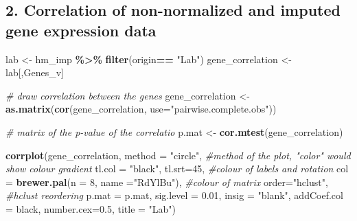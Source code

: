 \documentclass[
]{article}
\newenvironment{Shaded}{\begin{snugshade}}{\end{snugshade}}
\newcommand{\AttributeTok}[1]{\textcolor[rgb]{0.13,0.29,0.53}{#1}}
\newcommand{\CommentTok}[1]{\textcolor[rgb]{0.56,0.35,0.01}{\textit{#1}}}
\newcommand{\DecValTok}[1]{\textcolor[rgb]{0.00,0.00,0.81}{#1}}
\newcommand{\FloatTok}[1]{\textcolor[rgb]{0.00,0.00,0.81}{#1}}
\newcommand{\FunctionTok}[1]{\textcolor[rgb]{0.13,0.29,0.53}{\textbf{#1}}}
\newcommand{\NormalTok}[1]{#1}
\newcommand{\OtherTok}[1]{\textcolor[rgb]{0.56,0.35,0.01}{#1}}
\newcommand{\SpecialCharTok}[1]{\textcolor[rgb]{0.81,0.36,0.00}{\textbf{#1}}}
\newcommand{\StringTok}[1]{\textcolor[rgb]{0.31,0.60,0.02}{#1}}
\begin{document}
\hypertarget{correlation-of-non-normalized-and-imputed-gene-expression-data}{%
\subsection{2. Correlation of non-normalized and imputed gene expression
data}\label{correlation-of-non-normalized-and-imputed-gene-expression-data}}

\begin{Shaded}
\begin{Highlighting}[]
\NormalTok{lab }\OtherTok{\textless{}{-}}\NormalTok{ hm\_imp }\SpecialCharTok{\%\textgreater{}\%}
    \FunctionTok{filter}\NormalTok{(origin}\SpecialCharTok{==} \StringTok{"Lab"}\NormalTok{)}
\NormalTok{gene\_correlation }\OtherTok{\textless{}{-}}\NormalTok{ lab[,Genes\_v]}

\CommentTok{\# draw correlation between the genes}
\NormalTok{gene\_correlation }\OtherTok{\textless{}{-}} \FunctionTok{as.matrix}\NormalTok{(}\FunctionTok{cor}\NormalTok{(gene\_correlation, }
                                  \AttributeTok{use=}\StringTok{"pairwise.complete.obs"}\NormalTok{))}

\CommentTok{\# matrix of the p{-}value of the correlatio}
\NormalTok{p.mat }\OtherTok{\textless{}{-}} \FunctionTok{cor.mtest}\NormalTok{(gene\_correlation)}

\FunctionTok{corrplot}\NormalTok{(gene\_correlation, }
         \AttributeTok{method =} \StringTok{"circle"}\NormalTok{,  }\CommentTok{\#method of the plot, "color" would show colour gradient}
         \AttributeTok{tl.col =} \StringTok{"black"}\NormalTok{, }\AttributeTok{tl.srt=}\DecValTok{45}\NormalTok{, }\CommentTok{\#colour of labels and rotation}
         \AttributeTok{col =} \FunctionTok{brewer.pal}\NormalTok{(}\AttributeTok{n =} \DecValTok{8}\NormalTok{, }\AttributeTok{name =}\StringTok{"RdYlBu"}\NormalTok{), }\CommentTok{\#colour of matrix}
         \AttributeTok{order=}\StringTok{"hclust"}\NormalTok{, }\CommentTok{\#hclust reordering}
         \AttributeTok{p.mat =}\NormalTok{ p.mat, }\AttributeTok{sig.level =} \FloatTok{0.01}\NormalTok{, }\AttributeTok{insig =} \StringTok{"blank"}\NormalTok{,}
         \AttributeTok{addCoef.col =} \StringTok{\textquotesingle{}black\textquotesingle{}}\NormalTok{,}
         \AttributeTok{number.cex=}\FloatTok{0.5}\NormalTok{,}
         \AttributeTok{title =} \StringTok{"Lab"}\NormalTok{) }
\end{Highlighting}
\end{Shaded}
\end{document}
